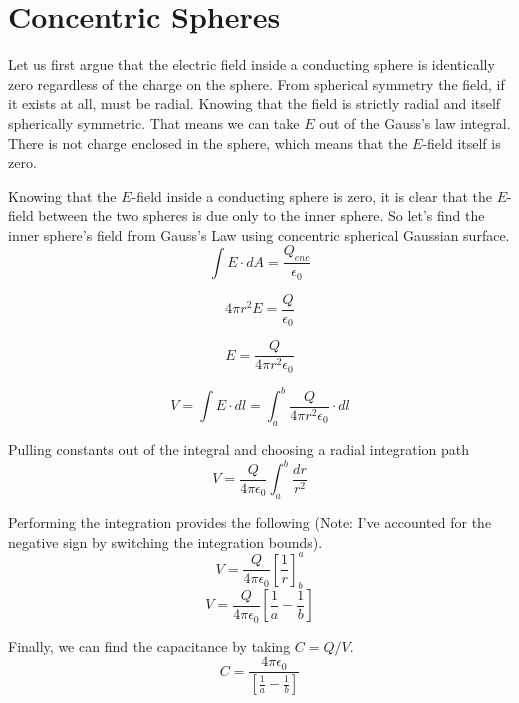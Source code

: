 \documentclass[10pt,a4paper]{article}
\begin{document}
\section{Concentric Spheres}
Let us first argue that the electric field inside a conducting sphere is identically zero regardless of the charge on the sphere. From spherical symmetry the field, if it exists at all, must be radial. Knowing that the field is strictly radial and itself spherically symmetric. That means we can take $E$ out of the Gauss's law integral. There is not charge enclosed in the sphere, which means that the $E$-field itself is zero.

Knowing that the $E$-field inside a conducting sphere is zero, it is clear that the $E$-field between the two spheres is due only to the inner sphere.  So let's find the inner sphere's field from Gauss's Law using concentric spherical Gaussian surface.
\begin{equation}
\int E\cdot dA = \frac{Q_{enc}}{\epsilon_0}
\end{equation}

\begin{equation}
4\pi r^2 E = \frac{Q}{\epsilon_0}
\end{equation}

\begin{equation}
E=\frac{Q}{4\pi r^2 \epsilon_0}
\end{equation}

\begin{equation}
V=\int E\cdot dl = \int_a^b \frac{Q}{4\pi r^2 \epsilon_0} \cdot dl
\end{equation}

Pulling constants out of the integral and choosing a radial integration path
\begin{equation}
V=\frac{Q}{4\pi \epsilon_0}\int_a^b\frac{dr}{r^2}
\end{equation}

Performing the integration provides the following (Note: I've accounted for the negative sign by switching the integration bounds).
\begin{equation}
V=\frac{Q}{4\pi \epsilon_0}\left[\frac{1}{r}\right]_b^a
\end{equation}
\begin{equation}
V = \frac{Q}{4\pi \epsilon_0}\left[\frac{1}{a}-\frac{1}{b}\right]
\end{equation}

Finally, we can find the capacitance by taking $C=Q/V$.
\begin{equation}\boxed{
C=\frac{4\pi\epsilon_0}{\left[\frac{1}{a}-\frac{1}{b}\right]}
}\end{equation}
\end{document}
